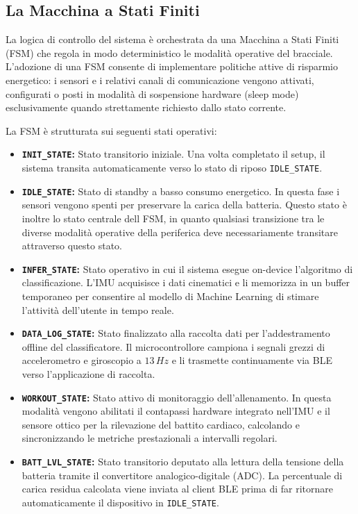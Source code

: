 \subsection{La Macchina a Stati Finiti}
La logica di controllo del sistema è orchestrata da una Macchina a Stati Finiti (FSM) che regola in modo deterministico le modalità operative del bracciale.
L'adozione di una FSM consente di implementare politiche attive di risparmio energetico: i sensori e i relativi canali di comunicazione vengono attivati, configurati o posti in modalità di sospensione hardware (sleep mode) esclusivamente quando strettamente richiesto dallo stato corrente.

La FSM è strutturata sui seguenti stati operativi:
\begin{itemize}
    \item \textbf{\texttt{INIT\_STATE}:} Stato transitorio iniziale. Una volta completato il setup, il sistema transita automaticamente verso lo stato di riposo \texttt{IDLE\_STATE}.
    \item \textbf{\texttt{IDLE\_STATE}:} Stato di standby a basso consumo energetico. In questa fase i sensori vengono spenti per preservare la carica della batteria. Questo stato è inoltre lo stato centrale dell FSM, in quanto qualsiasi transizione tra le diverse modalità operative della periferica deve necessariamente transitare attraverso questo stato.
    \item \textbf{\texttt{INFER\_STATE}:} Stato operativo in cui il sistema esegue on-device l'algoritmo di classificazione. L'IMU acquisisce i dati cinematici e li memorizza in un buffer temporaneo per consentire al modello di Machine Learning di stimare l'attività dell'utente in tempo reale.
    \item \textbf{\texttt{DATA\_LOG\_STATE}:} Stato finalizzato alla raccolta dati per l'addestramento offline del classificatore. Il microcontrollore campiona i segnali grezzi di accelerometro e giroscopio a $13\,Hz$ e li trasmette continuamente via BLE verso l'applicazione di raccolta.
    \item \textbf{\texttt{WORKOUT\_STATE}:} Stato attivo di monitoraggio dell'allenamento. In questa modalità vengono abilitati il contapassi hardware integrato nell'IMU e il sensore ottico per la rilevazione del battito cardiaco, calcolando e sincronizzando le metriche prestazionali a intervalli regolari.
    \item \textbf{\texttt{BATT\_LVL\_STATE}:} Stato transitorio deputato alla lettura della tensione della batteria tramite il convertitore analogico-digitale (ADC). La percentuale di carica residua calcolata viene inviata al client BLE prima di far ritornare automaticamente il dispositivo in \texttt{IDLE\_STATE}.
\end{itemize}

